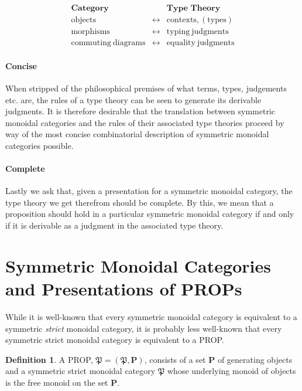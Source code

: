 \documentclass[pra,floatfix,
amsmath,superscriptaddress, 12pt]{article}
\theoremstyle{definition}
\newtheorem{definition}{Definition}
\begin{document}
\begin{eqnarray*}
\textbf{Category}              &  & \textbf{Type Theory}\\
\mathrm{objects}                & \longleftrightarrow & \mathrm{contexts, (types)}\\
\mathrm{morphisms}              & \longleftrightarrow & \mathrm{typing\ judgments}\\
\mathrm{commuting\ diagrams}     & \longleftrightarrow & \mathrm{equality\ judgments}
\end{eqnarray*}


\paragraph{Concise} When stripped of the philosophical premises of what terms, types, judgements etc. are, the rules of a type theory can be seen to generate its derivable judgments. It is therefore desirable that the translation between symmetric monoidal categories and the rules of their associated type theories proceed by way of the most concise combinatorial description of symmetric monoidal categories possible.

\paragraph{Complete} Lastly we ask that, given a presentation for a symmetric monoidal category, the type theory we get therefrom should be complete. By this, we mean that a proposition should hold in a particular symmetric monoidal category if and only if it is derivable as a judgment in the associated type theory.

\section{Symmetric Monoidal Categories and Presentations of \textsf{PROP}s}

While it is well-known that every symmetric monoidal category is equivalent
to a symmetric \emph{strict} monoidal category, it is probably less well-known that every symmetric strict monoidal category is equivalent to
a \textsf{PROP}.

\begin{definition} A \textsf{PROP}, $\mathfrak{P}=(\mathfrak{P},\mathbf{P})$, consists of a set $\mathbf{P}$ of generating objects and a symmetric strict monoidal category $\mathfrak{P}$ whose underlying monoid of objects is the free monoid on the set $\mathbf{P}$.
\end{definition}
\end{document}

